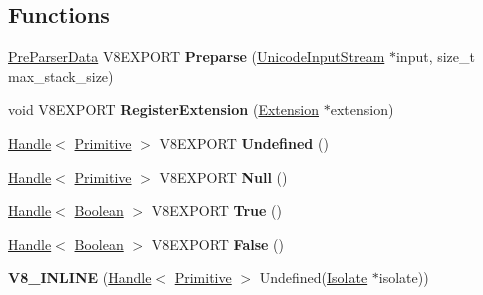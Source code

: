 \subsection*{Functions}
\begin{DoxyCompactItemize}
\item 
\hypertarget{namespacev8_a60529eae9a307e776559503f563436ed}{}\hyperlink{classv8_1_1_pre_parser_data}{Pre\+Parser\+Data} V8\+E\+X\+P\+O\+R\+T {\bfseries Preparse} (\hyperlink{classv8_1_1_unicode_input_stream}{Unicode\+Input\+Stream} $\ast$input, size\+\_\+t max\+\_\+stack\+\_\+size)\label{namespacev8_a60529eae9a307e776559503f563436ed}

\item 
\hypertarget{namespacev8_a7cbab71dcaa41657f6784aa76d01b8f6}{}void V8\+E\+X\+P\+O\+R\+T {\bfseries Register\+Extension} (\hyperlink{classv8_1_1_extension}{Extension} $\ast$extension)\label{namespacev8_a7cbab71dcaa41657f6784aa76d01b8f6}

\item 
\hypertarget{namespacev8_ad39cfade81e77137fc11ff3a24284340}{}\hyperlink{classv8_1_1_handle}{Handle}$<$ \hyperlink{classv8_1_1_primitive}{Primitive} $>$ V8\+E\+X\+P\+O\+R\+T {\bfseries Undefined} ()\label{namespacev8_ad39cfade81e77137fc11ff3a24284340}

\item 
\hypertarget{namespacev8_aa6bb9749edb4ef25314964762bc4d5e8}{}\hyperlink{classv8_1_1_handle}{Handle}$<$ \hyperlink{classv8_1_1_primitive}{Primitive} $>$ V8\+E\+X\+P\+O\+R\+T {\bfseries Null} ()\label{namespacev8_aa6bb9749edb4ef25314964762bc4d5e8}

\item 
\hypertarget{namespacev8_a9201601bde0d0b9bd26e474d841e2710}{}\hyperlink{classv8_1_1_handle}{Handle}$<$ \hyperlink{classv8_1_1_boolean}{Boolean} $>$ V8\+E\+X\+P\+O\+R\+T {\bfseries True} ()\label{namespacev8_a9201601bde0d0b9bd26e474d841e2710}

\item 
\hypertarget{namespacev8_a06ef84e71fefe9af11b127b632bb7527}{}\hyperlink{classv8_1_1_handle}{Handle}$<$ \hyperlink{classv8_1_1_boolean}{Boolean} $>$ V8\+E\+X\+P\+O\+R\+T {\bfseries False} ()\label{namespacev8_a06ef84e71fefe9af11b127b632bb7527}

\item 
\hypertarget{namespacev8_a07441f3178e27898de61aebc125c17d9}{}{\bfseries V8\+\_\+\+I\+N\+L\+I\+N\+E} (\hyperlink{classv8_1_1_handle}{Handle}$<$ \hyperlink{classv8_1_1_primitive}{Primitive} $>$ Undefined(\hyperlink{classv8_1_1_isolate}{Isolate} $\ast$isolate))\label{namespacev8_a07441f3178e27898de61aebc125c17d9}


\end{DoxyCompactItemize}
